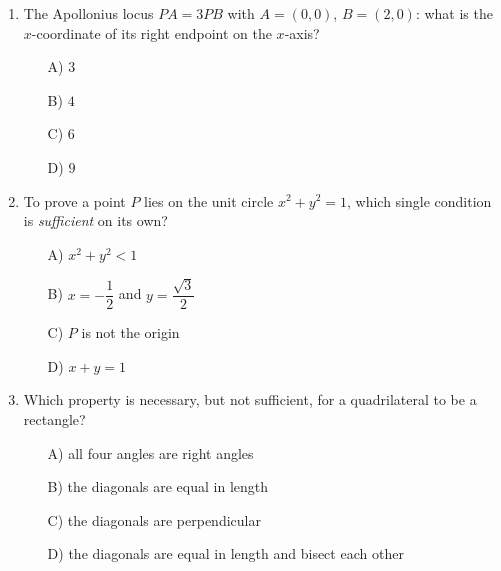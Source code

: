 \documentclass[11pt,a4paper]{article}
\begin{document}
\begin{enumerate}
\item The Apollonius locus $PA=3PB$ with $A=(0,0)$, $B=(2,0)$: what is the $x$-coordinate of its right endpoint on the $x$-axis?
\begin{itemize}
\item[A)] $3$
\item[B)] $4$
\item[C)] $6$
\item[D)] $9$
\end{itemize}


\item To prove a point $P$ lies on the unit circle $x^2+y^2=1$, which single condition is {\em sufficient} on its own?
\begin{itemize}
\item[A)] $x^2+y^2<1$
\item[B)] $x=-\dfrac12$ and $y=\dfrac{\sqrt3}{2}$
\item[C)] $P$ is not the origin
\item[D)] $x+y=1$
\end{itemize}


\item Which property is necessary, but not sufficient, for a quadrilateral to be a rectangle?
\begin{itemize}
\item[A)] all four angles are right angles
\item[B)] the diagonals are equal in length
\item[C)] the diagonals are perpendicular
\item[D)] the diagonals are equal in length and bisect each other
\end{itemize}


\end{enumerate}
\end{document}
